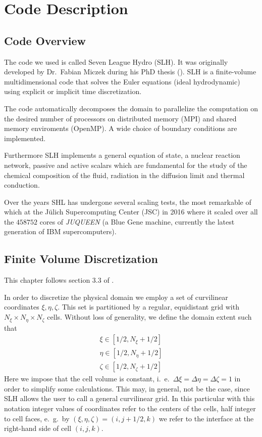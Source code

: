 \chapter{Code Description}
\section{Code Overview}
The code we used is called Seven League Hydro (SLH). It was originally developed by Dr.\ Fabian Miczek during his PhD thesis (\citet{miczek)}). SLH is a finite-volume multidimensional code that solves the Euler equations (ideal hydrodynamic) using explicit or implicit time discretization.

The code automatically decomposes the domain to parallelize the computation on the desired number of processors on distributed memory (MPI) and shared memory enviroments (OpenMP). A wide choice of boundary conditions are implemented. 

Furthermore SLH implements a general equation of state, a nuclear reaction network, passive and active scalars which are fundamental for the study of the chemical composition of the fluid, radiation in the diffusion limit and thermal conduction. 

Over the years SHL has undergone several scaling tests, the most remarkable of which at the Jülich Supercomputing Center (JSC) in 2016 where it scaled over all the $458752$ cores of \textit{JUQUEEN} (a Blue Gene machine, currently the latest generation of IBM supercomputers).

\section{Finite Volume Discretization}
This chapter follows section 3.3 of \citet{miczek}.

In order to discretize the physical domain we employ a set of curvilinear coordinates $\xi, \eta, \zeta$. This set is partitioned by a regular, equidistant grid with $N_{\xi} \times N_{\eta} \times N_{\zeta}$ cells. Without loss of generality, we define the domain extent such that
\begin{equation}
\begin{split}
\xi \in [1/2, N_{\xi} + 1/2] \\
\eta \in [1/2, N_{\eta} + 1/2] \\
\zeta \in [1/2, N_{\zeta} + 1/2] 
\end{split}
\end{equation}
Here we impose that the cell volume is constant, i.\ e.\ $\Delta \xi = \Delta \eta = \Delta \zeta = 1$ in order to simplify some calculations. This may, in general, not be the case, since SLH allows the user to call a general curvilinear grid. In this particular with this notation integer values of coordinates refer to the centers of the cells, half integer to cell faces, e.\ g.\ by $(\xi, \eta, \zeta) = (i, j + 1/2, k)$ we refer to the interface at the right-hand side of cell $(i, j, k)$.

